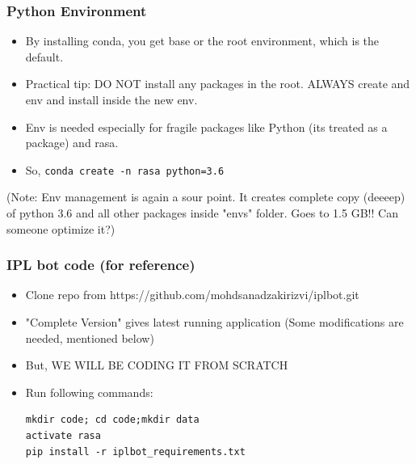 
 \begin{frame}[fragile]\frametitle{Python Environment}
\begin{itemize}
\item By installing conda, you get base or the root environment, which is the default.
\item Practical tip: DO NOT install any packages in the root. ALWAYS create and env and install inside the new env.
\item Env is needed especially for fragile packages like Python (its treated as a package) and rasa.
\item So, \lstinline|conda create -n rasa python=3.6| 
\end{itemize}

(Note: Env management is again a sour point. It creates complete copy (deeeep) of python 3.6 and all other packages inside "envs" folder. Goes to 1.5 GB!! Can someone optimize it?)
\end{frame}

 \begin{frame}[fragile]\frametitle{IPL bot code (for reference)}
\begin{itemize}
\item Clone repo from https://github.com/mohdsanadzakirizvi/iplbot.git
\item  "Complete Version" gives latest running application (Some modifications are needed, mentioned below)
\item But, WE WILL BE CODING IT FROM SCRATCH
\item Run following commands:

\begin{lstlisting}
mkdir code; cd code;mkdir data
activate rasa
pip install -r iplbot_requirements.txt
\end{lstlisting}

\end{itemize}
\end{frame}




